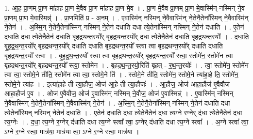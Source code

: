 \documentclass[17pt]{extarticle}
\begin{document}
1. आ॒ह॒ प्रा॒णम् प्रा॒ण मा॑हाह प्रा॒ण मे॒वैव प्रा॒ण मा॑हाह प्रा॒ण मे॒व । . प्रा॒ण मे॒वैव प्रा॒णम् प्रा॒ण मे॒वास्मि॑न् नस्मिन् ने॒व प्रा॒णम् प्रा॒ण मे॒वास्मिन्न्॑ । . प्रा॒णमिति॑ प्र - अ॒नम् । . ए॒वास्मि॑न् नस्मिन् ने॒वैवास्मि॑न् ने॒तेनै॒तेना᳚स्मिन् ने॒वैवास्मि॑न् ने॒तेन॑ । . अ॒स्मि॒न् ने॒तेनै॒तेना᳚स्मिन् नस्मिन् ने॒तेन॑ दधाति दधा त्ये॒तेना᳚स्मिन् नस्मिन् ने॒तेन॑ दधाति । . ए॒तेन॑ दधाति दधा त्ये॒तेनै॒तेन॑ दधाति बृहद्रथन्त॒रयो᳚र् बृहद्रथन्त॒रयो᳚र् दधा त्ये॒तेनै॒तेन॑ दधाति बृहद्रथन्त॒रयोः᳚ । . द॒धा॒ति॒ बृ॒ह॒द्र॒थ॒न्त॒रयो᳚र् बृहद्रथन्त॒रयो᳚र् दधाति दधाति बृहद्रथन्त॒रयो᳚ स्त्वा त्वा बृहद्रथन्त॒रयो᳚र् दधाति दधाति बृहद्रथन्त॒रयो᳚ स्त्वा । . बृ॒ह॒द्र॒थ॒न्त॒रयो᳚ स्त्वा त्वा बृहद्रथन्त॒रयो᳚र् बृहद्रथन्त॒रयो᳚ स्त्वा॒ स्तोमे॑न॒ स्तोमे॑न त्वा बृहद्रथन्त॒रयो᳚र् बृहद्रथन्त॒रयो᳚ स्त्वा॒ स्तोमे॑न । . बृ॒ह॒द्र॒थ॒न्त॒रयो॒रिति॑ बृहत् - र॒थ॒न्त॒रयोः᳚ । . त्वा॒ स्तोमे॑न॒ स्तोमे॑न त्वा त्वा॒ स्तोमे॒ने तीति॒ स्तोमे॑न त्वा त्वा॒ स्तोमे॒ने ति॑ । . स्तोमे॒ने तीति॒ स्तोमे॑न॒ स्तोमे॒ने त्या॑हा॒हे ति॒ स्तोमे॑न॒ स्तोमे॒ने त्या॑ह । . इत्या॑हा॒हे ती त्या॒हौज॒ ओज॑ आ॒हे ती त्या॒हौजः॑ । . आ॒हौज॒ ओज॑ आहा॒हौज॑ ए॒वैवौज॑ आहा॒हौज॑ ए॒व । . ओज॑ ए॒वैवौज॒ ओज॑ ए॒वास्मि॑न् नस्मिन् ने॒वौज॒ ओज॑ ए॒वास्मिन्न्॑ । . ए॒वास्मि॑न् नस्मिन् ने॒वैवास्मि॑न् ने॒तेनै॒तेना᳚स्मिन् ने॒वैवास्मि॑न् ने॒तेन॑ । . अ॒स्मि॒न् ने॒तेनै॒तेना᳚स्मिन् नस्मिन् ने॒तेन॑ दधाति दधा त्ये॒तेना᳚स्मिन् नस्मिन् ने॒तेन॑ दधाति । . ए॒तेन॑ दधाति दधा त्ये॒तेनै॒तेन॑ दधा त्य॒ग्ने र॒ग्नेर् द॑धा त्ये॒तेनै॒तेन॑ दधा त्य॒ग्नेः । . द॒धा॒ त्य॒ग्ने र॒ग्नेर् द॑धाति दधा त्य॒ग्ने स्त्वा᳚ त्वा॒ ऽग्नेर् द॑धाति दधा त्य॒ग्ने स्त्वा᳚ । . अ॒ग्ने स्त्वा᳚ त्वा॒ ऽग्ने र॒ग्ने स्त्वा॒ मात्र॑या॒ मात्र॑या त्वा॒ ऽग्ने र॒ग्ने स्त्वा॒ मात्र॑या । \newline
\end{document}
